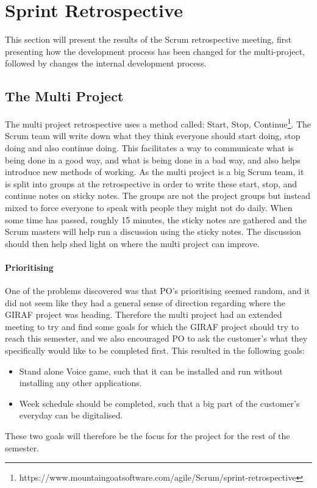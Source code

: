 \section{Sprint Retrospective}\label{s1retro}
This section will present the results of the Scrum retrospective meeting, first presenting how the development process has been changed for the multi-project, followed by changes the internal development process.

\subsection{The Multi Project}\label{retro1}
The multi project retrospective uses a method called: Start, Stop, Continue\footnote{https://www.mountaingoatsoftware.com/agile/Scrum/sprint-retrospective}.
The Scrum team will write down what they think everyone should start doing, stop doing and also continue doing. 
This facilitates a way to communicate what is being done in a good way, and what is being done in a bad way, and also helps introduce new methods of working.
As the multi project is a big Scrum team, it is split into groups at the retrospective in order to write these start, stop, and continue notes on sticky notes.
The groups are not the project groups but instead mixed to force everyone to speak with people they might not do daily.
When some time has passed, roughly 15 minutes, the sticky notes are gathered and the Scrum masters will help run a discussion using the sticky notes.
The discussion should then help shed light on where the multi project can improve.

\paragraph{Prioritising} One of the problems discovered was that PO's prioritising seemed random, and it did not seem like they had a general sense of direction regarding where the GIRAF project was heading.
Therefore the multi project had an extended meeting to try and find some goals for which the GIRAF project should try to reach this semester, and we also encouraged PO to ask the customer's what they specifically would like to be completed first.
This resulted in the following goals:
\begin{itemize}
	\item Stand alone Voice game, such that it can be installed and run without installing any other applications.
	\item Week schedule should be completed, such that a big part of the customer's everyday can be digitalised.
\end{itemize}
These two goals will therefore be the focus for the project for the rest of the semester. 

